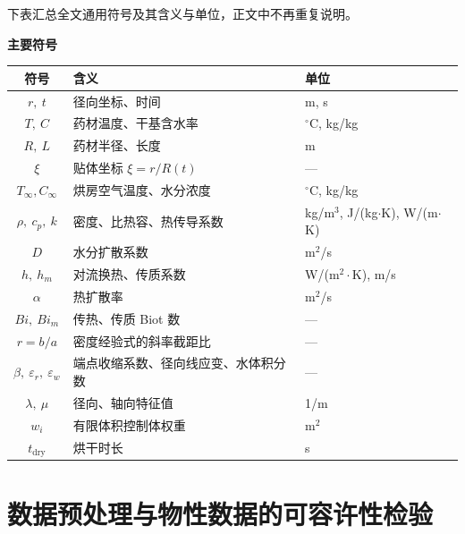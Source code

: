 \documentclass[12pt,a4paper,fontset=none]{ctexart}
\begin{document}
下表汇总全文通用符号及其含义与单位，正文中不再重复说明。

\begin{center}
\begin{minipage}{\textwidth}
  \centering
  \small
  \textbf{主要符号}\\[4pt]
  \begin{tabular}{cll}
    \toprule
    符号 & 含义 & 单位 \\
    \midrule
    $r,\ t$            & 径向坐标、时间              & m, s \\
    $T,\ C$            & 药材温度、干基含水率        & $^\circ$C, kg/kg \\
    $R,\ L$            & 药材半径、长度              & m \\
    $\xi$              & 贴体坐标 $\xi=r/R(t)$       & --- \\
    $T_\infty,C_\infty$ & 烘房空气温度、水分浓度     & $^\circ$C, kg/kg \\
    $\rho,\ c_p,\ k$   & 密度、比热容、热传导系数    & kg/m$^3$, J/(kg$\cdot$K), W/(m$\cdot$K) \\
    $D$                & 水分扩散系数                & m$^2$/s \\
    $h,\ h_m$          & 对流换热、传质系数          & W/(m$^2\cdot$K), m/s \\
    $\alpha$           & 热扩散率                    & m$^2$/s \\
    $Bi,\ Bi_m$        & 传热、传质 Biot 数          & --- \\
    $r=b/a$            & 密度经验式的斜率截距比      & --- \\
    $\beta,\ \varepsilon_r,\ \varepsilon_w$
                       & 端点收缩系数、径向线应变、水体积分数 & --- \\
    $\lambda,\ \mu$    & 径向、轴向特征值            & 1/m \\
    $w_i$              & 有限体积控制体权重          & m$^2$ \\
    $t_{\mathrm{dry}}$ & 烘干时长                    & s \\
    \bottomrule
  \end{tabular}
\end{minipage}
\end{center}

\section{数据预处理与物性数据的可容许性检验}
\label{sec:preproc}
\end{document}

